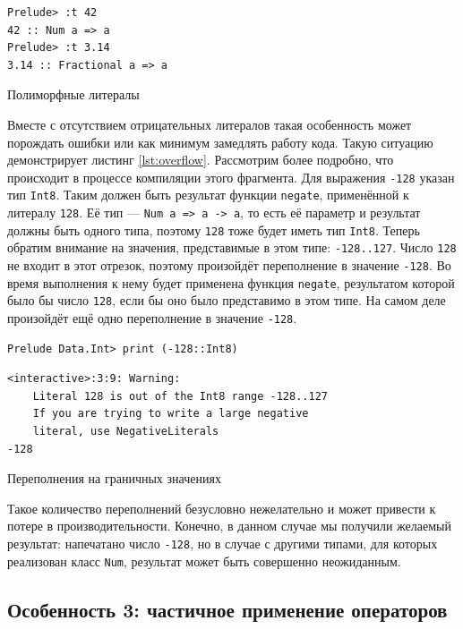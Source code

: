 \begin{ListingEnv}[H]
\begin{lstlisting}
Prelude> :t 42
42 :: Num a => a
Prelude> :t 3.14
3.14 :: Fractional a => a
\end{lstlisting}
\caption{Полиморфные литералы}
\label{lst:types}
\end{ListingEnv}

Вместе с отсутствием отрицательных литералов такая особенность может порождать
ошибки или как минимум замедлять работу кода. Такую ситуацию демонстрирует
листинг \ref{lst:overflow}. Рассмотрим более подробно, что происходит в
процессе компиляции этого фрагмента. Для выражения \texttt{-128} указан тип
\texttt{Int8}. Таким должен быть результат функции \texttt{negate}, применённой
к литералу \texttt{128}. Её тип --- \texttt{Num a => a -> a}, то есть её
параметр и результат должны быть одного типа, поэтому \texttt{128} тоже будет
иметь тип \texttt{Int8}. Теперь обратим внимание на значения, представимые в
этом типе: \texttt{-128..127}. Число \texttt{128} не входит в этот отрезок,
поэтому произойдёт переполнение в значение \texttt{-128}.  Во время выполнения
к нему будет применена функция \texttt{negate}, результатом которой было бы
число \texttt{128}, если бы оно было представимо в этом типе.  На самом деле
произойдёт ещё одно переполнение в значение \texttt{-128}.

\begin{ListingEnv}[H]
\begin{lstlisting}
Prelude Data.Int> print (-128::Int8)
\end{lstlisting}
\begin{verbatim}
<interactive>:3:9: Warning:
    Literal 128 is out of the Int8 range -128..127
    If you are trying to write a large negative
    literal, use NegativeLiterals
-128
\end{verbatim}
\caption{Переполнения на граничных значениях}
\label{lst:overflow}
\end{ListingEnv}

Такое количество переполнений безусловно нежелательно и может привести к потере
в производительности. Конечно, в данном случае мы получили желаемый результат:
напечатано число \texttt{-128}, но в случае с другими типами, для которых
реализован класс \texttt{Num}, результат может быть совершенно неожиданным.

\subsection{Особенность 3: частичное применение операторов}

